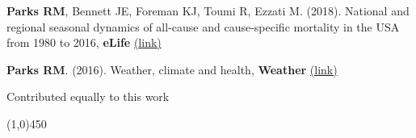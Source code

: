\noindent \textbf{Parks RM}, Bennett JE, Foreman KJ, Toumi R, Ezzati M. (2018). National and regional seasonal dynamics of all-cause and cause-specific mortality in the USA from 1980 to 2016, \textbf{eLife}  \href{https://doi.org/10.7554/eLife.35500}{(link)} \medskip

\noindent \textbf{Parks RM}. (2016). Weather, climate and health, \textbf{Weather} \href{https://doi.org/10.1002/wea.2752}{(link)} \medskip

\noindent * Contributed equally to this work

\begin{center} \line(1,0){450} \end{center}